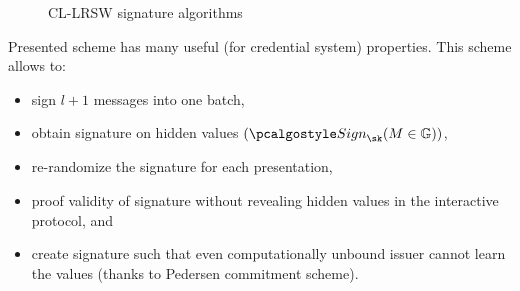 \begin{figure}[htp]
\begin{pcvstack}
\pcvspace


\end{pcvstack}

\caption{CL-LRSW signature algorithms}
\label{fig:cl-lrsw}
\end{figure}

Presented scheme has many useful (for credential system) properties. This scheme allows to:
\begin{itemize}
  \item sign $l+1$ messages into one batch,
  \item obtain signature on hidden values $(\sig_\sk(M \in \Group))$,
  \item re-randomize the signature for each presentation,
  \item proof validity of signature without revealing hidden values in the interactive protocol, and
  \item create signature such that even computationally unbound issuer cannot learn the values (thanks to Pedersen commitment scheme).
\end{itemize}


